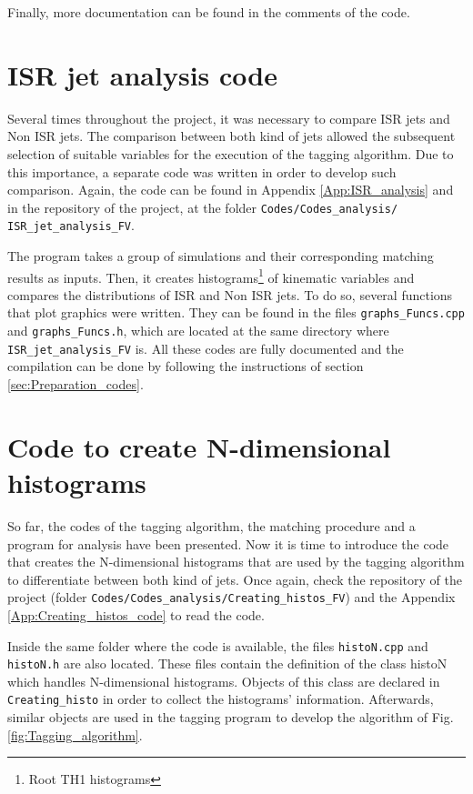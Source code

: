 \documentclass[12pt, oneside]{book}              %
\begin{document}
Finally, more documentation can be found in the comments of the code.

\section{ISR jet analysis code} \label{sec:ISR_analysys}

Several times throughout the project, it was necessary to compare ISR jets
and Non ISR jets. The comparison between both kind of jets allowed the
subsequent selection of suitable variables for the execution of 
the tagging algorithm. Due to this importance, a separate code was written
in order to develop such comparison. Again, the code can be found in 
Appendix \ref{App:ISR_analysis}  and in the repository of the project, at 
the folder \texttt{Codes/Codes\_analysis/ ISR\_jet\_analysis\_FV}.

The program takes a group of simulations and their corresponding matching
results  as inputs. Then, it creates histograms\footnote{Root TH1 histograms}
of kinematic variables and compares the distributions of ISR and Non ISR
jets. To do so, several functions that plot graphics were written. They can be 
found in the files \texttt{graphs\_Funcs.cpp} and \texttt{graphs\_Funcs.h},
which are located at the same directory where \texttt{ISR\_jet\_analysis\_FV}
is. All these codes are fully documented and the compilation can be done by
following the instructions of section \ref{sec:Preparation_codes}.

\section[Histograms code]{Code to create N-dimensional histograms} \label{sec: Creating_histo_code}

So far, the codes of the tagging algorithm, the matching procedure and a
program for analysis have been presented. Now it is time to introduce
the code that creates the N-dimensional histograms that are used 
by the tagging algorithm to differentiate between both kind of jets. Once again,
check the repository of the project (folder \texttt{Codes/Codes\_analysis/Creating\_histos\_FV})
and the Appendix \ref{App:Creating_histos_code} to read the code.

Inside the same folder where the code is available, the files \texttt{histoN.cpp}
and \texttt{histoN.h} are also located. These files contain the definition
of the class histoN which handles N-dimensional histograms. Objects of this 
class are declared in \texttt{Creating\_histo} in order to collect
the histograms' information. Afterwards, similar objects are used
in the tagging program to develop the algorithm of Fig.\ref{fig:Tagging_algorithm}.
\end{document}
